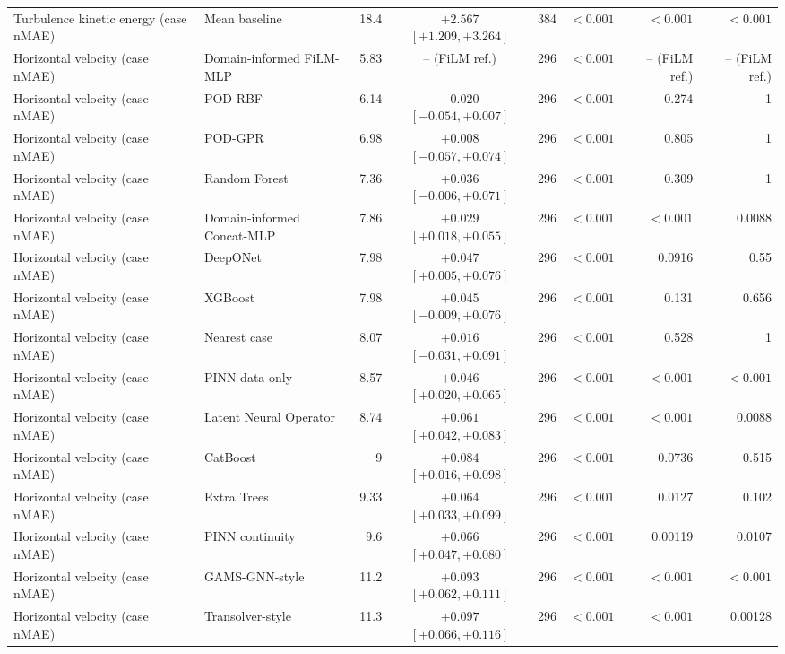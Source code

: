 \begin{landscape}
\begin{longtable}{p{4.0cm}p{3.4cm}rcrrrr}
Turbulence kinetic energy (case nMAE) & Mean baseline & 18.4 & $+2.567$ $[+1.209, +3.264]$ & 384 & $< 0.001$ & $< 0.001$ & $< 0.001$ \\
Horizontal velocity (case nMAE) & Domain-informed FiLM-MLP & 5.83 & -- (FiLM ref.) & 296 & $< 0.001$ & -- (FiLM ref.) & -- (FiLM ref.) \\
Horizontal velocity (case nMAE) & POD-RBF & 6.14 & $-0.020$ $[-0.054, +0.007]$ & 296 & $< 0.001$ & 0.274 & 1 \\
Horizontal velocity (case nMAE) & POD-GPR & 6.98 & $+0.008$ $[-0.057, +0.074]$ & 296 & $< 0.001$ & 0.805 & 1 \\
Horizontal velocity (case nMAE) & Random Forest & 7.36 & $+0.036$ $[-0.006, +0.071]$ & 296 & $< 0.001$ & 0.309 & 1 \\
Horizontal velocity (case nMAE) & Domain-informed Concat-MLP & 7.86 & $+0.029$ $[+0.018, +0.055]$ & 296 & $< 0.001$ & $< 0.001$ & 0.0088 \\
Horizontal velocity (case nMAE) & DeepONet & 7.98 & $+0.047$ $[+0.005, +0.076]$ & 296 & $< 0.001$ & 0.0916 & 0.55 \\
Horizontal velocity (case nMAE) & XGBoost & 7.98 & $+0.045$ $[-0.009, +0.076]$ & 296 & $< 0.001$ & 0.131 & 0.656 \\
Horizontal velocity (case nMAE) & Nearest case & 8.07 & $+0.016$ $[-0.031, +0.091]$ & 296 & $< 0.001$ & 0.528 & 1 \\
Horizontal velocity (case nMAE) & PINN data-only & 8.57 & $+0.046$ $[+0.020, +0.065]$ & 296 & $< 0.001$ & $< 0.001$ & $< 0.001$ \\
Horizontal velocity (case nMAE) & Latent Neural Operator & 8.74 & $+0.061$ $[+0.042, +0.083]$ & 296 & $< 0.001$ & $< 0.001$ & 0.0088 \\
Horizontal velocity (case nMAE) & CatBoost & 9 & $+0.084$ $[+0.016, +0.098]$ & 296 & $< 0.001$ & 0.0736 & 0.515 \\
Horizontal velocity (case nMAE) & Extra Trees & 9.33 & $+0.064$ $[+0.033, +0.099]$ & 296 & $< 0.001$ & 0.0127 & 0.102 \\
Horizontal velocity (case nMAE) & PINN continuity & 9.6 & $+0.066$ $[+0.047, +0.080]$ & 296 & $< 0.001$ & 0.00119 & 0.0107 \\
Horizontal velocity (case nMAE) & GAMS-GNN-style & 11.2 & $+0.093$ $[+0.062, +0.111]$ & 296 & $< 0.001$ & $< 0.001$ & $< 0.001$ \\
Horizontal velocity (case nMAE) & Transolver-style & 11.3 & $+0.097$ $[+0.066, +0.116]$ & 296 & $< 0.001$ & $< 0.001$ & 0.00128 \\

\end{longtable}
\end{landscape}
